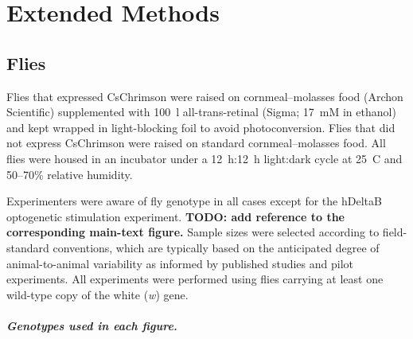 \chapter{Extended Methods}
\label{appendix:extended-methods}

\section{Flies}

Flies that expressed CsChrimson were raised on cornmeal--molasses food (Archon Scientific) supplemented with 100~\textmu l all-trans-retinal (Sigma; 17~mM in ethanol) and kept wrapped in light-blocking foil to avoid photoconversion. Flies that did not express CsChrimson were raised on standard cornmeal--molasses food. All flies were housed in an incubator under a 12~h:12~h light:dark cycle at 25~\textdegree C and 50--70\% relative humidity.

Experimenters were aware of fly genotype in all cases except for the hDeltaB optogenetic stimulation experiment. \textbf{TODO: add reference to the corresponding main-text figure.} Sample sizes were selected according to field-standard conventions, which are typically based on the anticipated degree of animal-to-animal variability as informed by published studies and pilot experiments. All experiments were performed using flies carrying at least one wild-type copy of the white (\textit{w}) gene.

\paragraph{Genotypes used in each figure.}

